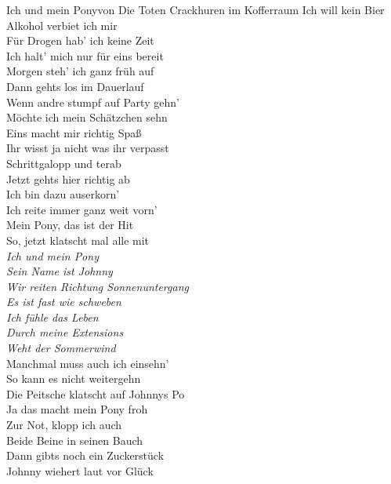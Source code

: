 
\begin{lied*}{Ich und mein Pony}{von Die Toten Crackhuren im Kofferraum}
Ich will kein Bier\\
Alkohol verbiet ich mir\\
Für Drogen hab’ ich keine Zeit\\
Ich halt’ mich nur für eins bereit\\

Morgen steh’ ich ganz früh auf\\
Dann gehts los im Dauerlauf\\
Wenn andre stumpf auf Party gehn’\\
Möchte ich mein Schätzchen sehn\\

Eins macht mir richtig Spaß\\
Ihr wisst ja nicht was ihr verpasst\\
Schrittgalopp und terab\\
Jetzt gehts hier richtig ab\\

Ich bin dazu auserkorn’\\
Ich reite immer ganz weit vorn’\\
Mein Pony, das ist der Hit\\
So, jetzt klatscht mal alle mit\\

\textit{Ich und mein Pony\\
Sein Name ist Johnny\\
Wir reiten Richtung Sonnenuntergang\\
Es ist fast wie schweben\\
Ich fühle das Leben\\
Durch meine Extensions\\
Weht der Sommerwind}\\

Manchmal muss auch ich einsehn’\\
So kann es nicht weitergehn\\
Die Peitsche klatscht auf Johnnys Po\\
Ja das macht mein Pony froh\\

Zur Not, klopp ich auch\\
Beide Beine in seinen Bauch\\
Dann gibts noch ein Zuckerstück\\
Johnny wiehert laut vor Glück\\


\end{lied*}
